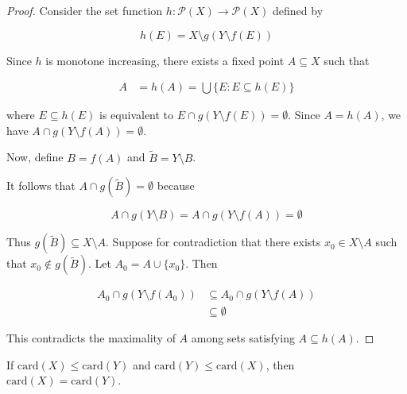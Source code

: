 \begin{proof}
    Consider the set function $h: \mathscr{P}(X) \to \mathscr{P}(X)$ defined by

    \[
        h(E) =  X \setminus g(Y \setminus f(E)) 
    \]

    Since $h$ is monotone increasing, there exists a fixed point $A \subseteq X$ such that

    \begin{align*}
        A &= h(A) = \bigcup \{ E: E \subseteq h(E) \}
    \end{align*}

    where $E \subseteq h(E)$ is equivalent to $E \cap g(Y \setminus f(E)) = \emptyset$.
    Since $A = h(A)$, we have $A \cap g(Y \setminus f(A)) = \emptyset$.

    Now, define $B = f(A)$ and $\tilde{B} = Y \setminus B$.

    It follows that $A \cap g(\tilde{B}) = \emptyset$ because

    \[
        A \cap g(Y \setminus B) =  A \cap g(Y \setminus f(A)) = \emptyset
    \]

    Thus $g(\tilde{B}) \subseteq X \setminus A$. Suppose for contradiction that there exists $x_0 \in X \setminus A$ such that $x_0 \notin g(\tilde{B})$.
    Let $A_0 = A \cup \{ x_0 \}$. Then

    \begin{align*}
        A_0 \cap g(Y \setminus f(A_0)) & \subseteq A_0  \cap g(Y \setminus f(A)) \\
        & \subseteq \emptyset 
    \end{align*}

    This contradicts the maximality of $A$ among sets satisfying $A \subseteq h(A)$.

\end{proof}

\begin{thm}
    If $\mathrm{card}(X) \le \mathrm{card}(Y)$ and $\mathrm{card}(Y) \le \mathrm{card}(X)$, then
    $\mathrm{card}(X) = \mathrm{card}(Y)$. 
\end{thm}


